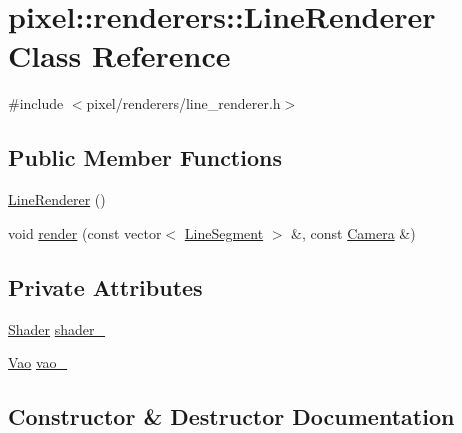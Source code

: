 \hypertarget{classpixel_1_1renderers_1_1_line_renderer}{}\section{pixel\+:\+:renderers\+:\+:Line\+Renderer Class Reference}
\label{classpixel_1_1renderers_1_1_line_renderer}


{\ttfamily \#include $<$pixel/renderers/line\+\_\+renderer.\+h$>$}

\subsection*{Public Member Functions}
\begin{DoxyCompactItemize}
\item 
\hyperlink{classpixel_1_1renderers_1_1_line_renderer_adf08d52089304ffbcdb6430b4d40c241}{Line\+Renderer} ()
\item 
void \hyperlink{classpixel_1_1renderers_1_1_line_renderer_a1980b5f5590d1f2c13d83db2551d819d}{render} (const vector$<$ \hyperlink{classpixel_1_1_line_segment}{Line\+Segment} $>$ \&, const \hyperlink{classpixel_1_1graphics_1_1_camera}{Camera} \&)
\end{DoxyCompactItemize}
\subsection*{Private Attributes}
\begin{DoxyCompactItemize}
\item 
\hyperlink{classpixel_1_1graphics_1_1_shader}{Shader} \hyperlink{classpixel_1_1renderers_1_1_line_renderer_a6a2758421a2ee6e249d78deb3a8d6ca2}{shader\+\_\+}
\item 
\hyperlink{classpixel_1_1graphics_1_1_vao}{Vao} \hyperlink{classpixel_1_1renderers_1_1_line_renderer_aaa62d25c3b7c62156a4c90053f6a659e}{vao\+\_\+}
\end{DoxyCompactItemize}


\subsection{Constructor \& Destructor Documentation}
\mbox{\label{classpixel_1_1renderers_1_1_line_renderer_adf08d52089304ffbcdb6430b4d40c241}} 
